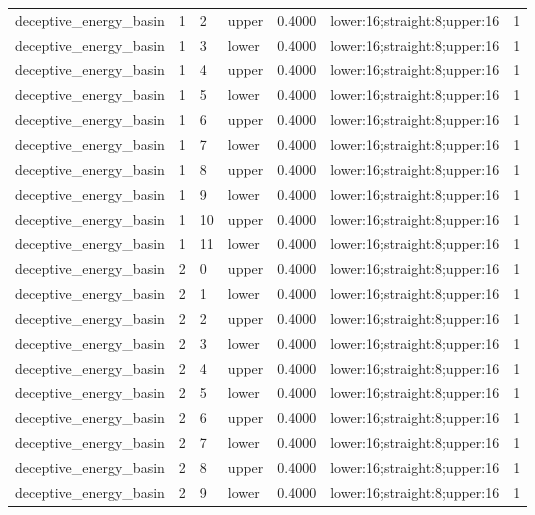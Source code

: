 \documentclass{article}
\begin{document}
\begin{table}[tbp]
{\begin{tabular}{lllllll}
deceptive\_energy\_basin & 1 & 2 & upper & 0.4000 & lower:16;straight:8;upper:16 & 1 \\
deceptive\_energy\_basin & 1 & 3 & lower & 0.4000 & lower:16;straight:8;upper:16 & 1 \\
deceptive\_energy\_basin & 1 & 4 & upper & 0.4000 & lower:16;straight:8;upper:16 & 1 \\
deceptive\_energy\_basin & 1 & 5 & lower & 0.4000 & lower:16;straight:8;upper:16 & 1 \\
deceptive\_energy\_basin & 1 & 6 & upper & 0.4000 & lower:16;straight:8;upper:16 & 1 \\
deceptive\_energy\_basin & 1 & 7 & lower & 0.4000 & lower:16;straight:8;upper:16 & 1 \\
deceptive\_energy\_basin & 1 & 8 & upper & 0.4000 & lower:16;straight:8;upper:16 & 1 \\
deceptive\_energy\_basin & 1 & 9 & lower & 0.4000 & lower:16;straight:8;upper:16 & 1 \\
deceptive\_energy\_basin & 1 & 10 & upper & 0.4000 & lower:16;straight:8;upper:16 & 1 \\
deceptive\_energy\_basin & 1 & 11 & lower & 0.4000 & lower:16;straight:8;upper:16 & 1 \\
deceptive\_energy\_basin & 2 & 0 & upper & 0.4000 & lower:16;straight:8;upper:16 & 1 \\
deceptive\_energy\_basin & 2 & 1 & lower & 0.4000 & lower:16;straight:8;upper:16 & 1 \\
deceptive\_energy\_basin & 2 & 2 & upper & 0.4000 & lower:16;straight:8;upper:16 & 1 \\
deceptive\_energy\_basin & 2 & 3 & lower & 0.4000 & lower:16;straight:8;upper:16 & 1 \\
deceptive\_energy\_basin & 2 & 4 & upper & 0.4000 & lower:16;straight:8;upper:16 & 1 \\
deceptive\_energy\_basin & 2 & 5 & lower & 0.4000 & lower:16;straight:8;upper:16 & 1 \\
deceptive\_energy\_basin & 2 & 6 & upper & 0.4000 & lower:16;straight:8;upper:16 & 1 \\
deceptive\_energy\_basin & 2 & 7 & lower & 0.4000 & lower:16;straight:8;upper:16 & 1 \\
deceptive\_energy\_basin & 2 & 8 & upper & 0.4000 & lower:16;straight:8;upper:16 & 1 \\
deceptive\_energy\_basin & 2 & 9 & lower & 0.4000 & lower:16;straight:8;upper:16 & 1 \\
\bottomrule
\end{tabular}
}
\end{table}
\end{document}
